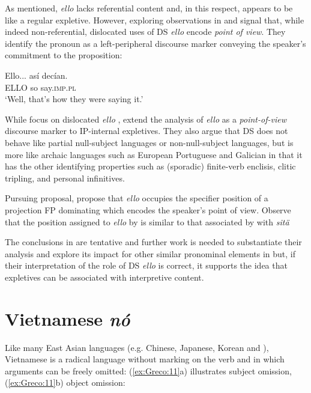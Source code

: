 \documentclass[output=paper]{LSP/langsci}
\begin{document}
As mentioned, \textit{ello} lacks referential content and, in this respect, appears to be like a regular expletive. However, exploring observations in \citet{MartínEtAl1999} and \citet{HinzelinEtAl2007} signal that, while indeed non-referential, dislocated uses of DS \textit{ello} encode \textit{point of view}. They identify the pronoun as a left-peripheral discourse marker conveying the speaker’s commitment to the proposition:

\ea%
    \label{ex:Greco:10}
    \citep[173]{HinzelinEtAl2007}
    \gll Ello...  así  decían.\\
	ELLO  so   say.\textsc{imp}.\textsc{pl}\\
    \glt ‘Well, that’s how they were saying it.’
    \z

While \citet{HinzelinEtAl2007} focus on dislocated \textit{ello} , \citet[344--345]{GuptonEtAl2014} extend the analysis of \textit{ello} as a \textit{point-of-view}\textit{} discourse marker to IP-internal expletives. They also argue that DS does not behave like partial null-subject languages or non-null-subject languages, but is more like archaic   languages such as European Portuguese and Galician in that it has the other identifying properties such as (sporadic) finite-verb enclisis, clitic tripling, and personal infinitives.

Pursuing  proposal, \citet{GuptonEtAl2014} propose that \textit{ello} occupies the specifier position of a projection FP dominating  which encodes the speaker’s point of view. Observe that the position assigned to \textit{ello} by \citet{GuptonEtAl2014} is similar to that associated by \citet{HolmbergEtAl2002} with  \textit{sitä} 

The conclusions in \citet{GuptonEtAl2014} are tentative and further work is needed to substantiate their analysis and explore its impact for other similar pronominal elements in  but, if their interpretation of the role of DS \textit{ello} is correct, it supports the idea that expletives can be associated with interpretive content.

\section{Vietnamese \textit{nó}}\label{sec:Greco:4}
Like many East Asian languages (e.g. Chinese, Japanese, Korean and ), Vietnamese is a radical  language \citep{Huang1984} without  marking on the verb and in which arguments can be freely omitted: (\ref{ex:Greco:11}a) illustrates subject omission, (\ref{ex:Greco:11}b) object omission:
\end{document}
